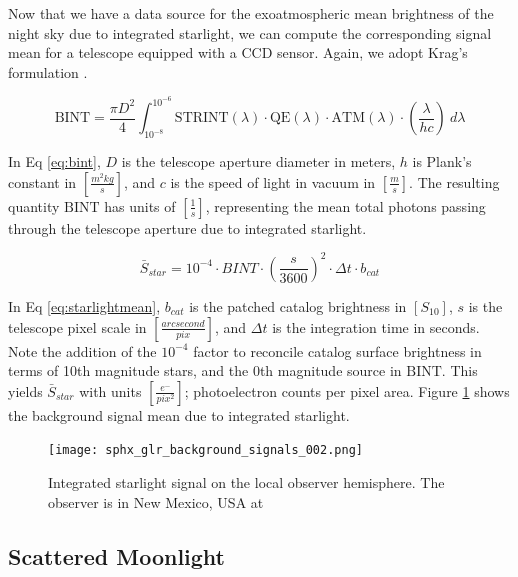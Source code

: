Now that we have a data source for the exoatmospheric mean brightness of the night sky due to integrated
starlight, we can compute the corresponding signal mean for a telescope equipped with a CCD sensor.
Again, we adopt Krag's formulation \cite{krag2003}.

\begin{equation} \label{eq:bint}
 \textrm{BINT} = \frac{\pi D^2}{4}
  \int_{10^{-8}}^{10^{-6}}{ \textrm{STRINT}(\lambda) \cdot \textrm{QE}(\lambda) \cdot \textrm{ATM}(\lambda)
  \cdot \left( \frac{\lambda}{h c} \right) \: d\lambda}  
\end{equation}

In Eq \ref{eq:bint}, $D$ is the telescope aperture diameter in meters, $h$ is Plank's constant in
$\left[ \frac{m^2 kg}{s} \right]$, and $c$
is the speed of light in vacuum in $\left[ \frac{m}{s} \right]$. The resulting quantity
$\textrm{BINT}$ has units of $\left[ \frac{1}{s} \right]$, representing the mean total photons passing
through the telescope aperture due to integrated starlight. 

\begin{equation} \label{eq:starlightmean}
  \bar{S}_{star} = 10^{-4} \cdot BINT \cdot \left( \frac{s}{3600} \right)^2 \cdot \Delta t \cdot
  b_{cat}
\end{equation}

In Eq \ref{eq:starlightmean}, $b_{cat}$ is the patched catalog brightness in $\left[ S_{10}
\right]$, $s$ is the telescope pixel scale in $\left[ \frac{arcsecond}{pix} \right]$, and $\Delta t$ is the integration time in seconds. Note the addition of the $10^{-4}$ factor to reconcile catalog surface brightness in terms of 10th magnitude stars, and the 0th magnitude source in $\textrm{BINT}$. This yields $\bar{S}_{star}$ with units $\left[ \frac{e^-}{pix^2} \right]$; photoelectron counts per pixel area. Figure \ref{fig:starlighthemi} shows the background signal mean due to integrated starlight.

\begin{figure}[ht]
  \centering
  \texttt{[image: sphx\_glr\_background\_signals\_002.png]}
  \caption{Integrated starlight signal on the local observer hemisphere. The observer is in New Mexico, USA at
  \pogslla}
  \label{fig:starlighthemi}
\end{figure}

\subsection{Scattered Moonlight}

